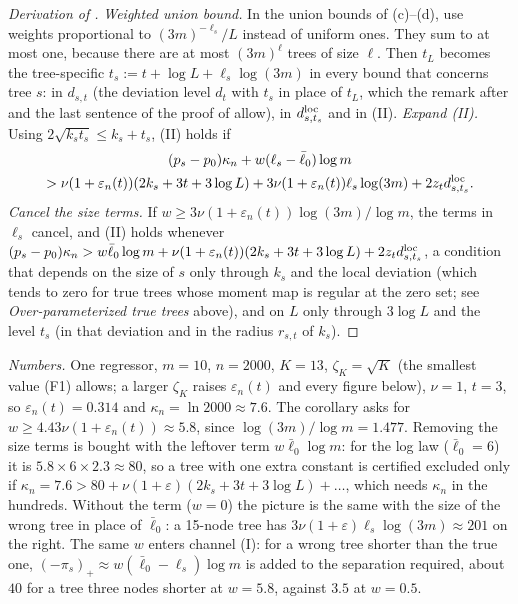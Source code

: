 \begin{proof}[Derivation of ]
\emph{Weighted union bound.} In the union bounds of (c)--(d), use weights proportional to $(3m)^{-\ell_s}/L$ instead of uniform ones. They sum to at most one, because there are at most $(3m)^{\ell}$ trees of size $\ell$. Then $t_L$ becomes the tree-specific $t_s := t + \log L + \ell_s\log(3m)$ in every bound that concerns tree $s$: in $d_{s,t}$ (the deviation level $d_t$ with $t_s$ in place of $t_L$, which the remark after  and the last sentence of the proof of  allow), in $d^{\mathrm{loc}}_{s,t_s}$ and in (II). \emph{Expand (II).} Using $2\sqrt{k_st_s} \le k_s + t_s$, (II) holds if
\begin{multline*}
(p_s - p_0)\kappa_n + w(\ell_s - \bar\ell_0)\log m \\ > \nu(1 + \varepsilon_n(t))(2k_s + 3t + 3\log L) + 3\nu(1 + \varepsilon_n(t))\ell_s\log(3m) + 2z_td^{\mathrm{loc}}_{s,t_s}.
\end{multline*}
\emph{Cancel the size terms.} If $w \ge 3\nu(1 + \varepsilon_n(t))\log(3m)/\log m$, the terms in $\ell_s$ cancel, and (II) holds whenever $(p_s - p_0)\kappa_n > w\bar\ell_0\log m + \nu(1 + \varepsilon_n(t))(2k_s + 3t + 3\log L) + 2z_td^{\mathrm{loc}}_{s,t_s}$, a condition that depends on the size of $s$ only through $k_s$ and the local deviation (which tends to zero for true trees whose moment map is regular at the zero set; see \emph{Over-parameterized true trees} above), and on $L$ only through $3\log L$ and the level $t_s$ (in that deviation and in the radius $r_{s,t}$ of $k_s$).
\end{proof}

\medskip\noindent\emph{Numbers.} One regressor, $m = 10$, $n = 2000$, $K = 13$, $\zeta_K = \sqrt K$ (the smallest value (F1) allows; a larger $\zeta_K$ raises $\varepsilon_n(t)$ and every figure below), $\nu = 1$, $t = 3$, so $\varepsilon_n(t) = 0.314$ and $\kappa_n = \ln 2000 \approx 7.6$. The corollary asks for $w \ge 4.43\nu(1 + \varepsilon_n(t)) \approx 5.8$, since $\log(3m)/\log m = 1.477$. Removing the size terms is bought with the leftover term $w\bar\ell_0\log m$: for the log law ($\bar\ell_0 = 6$) it is $5.8 \times 6 \times 2.3 \approx 80$, so a tree with one extra constant is certified excluded only if $\kappa_n = 7.6 > 80 + \nu(1 + \varepsilon)(2k_s + 3t + 3\log L) + \dots$, which needs $\kappa_n$ in the hundreds. Without the term ($w = 0$) the picture is the same with the size of the wrong tree in place of $\bar\ell_0$: a 15-node tree has $3\nu(1 + \varepsilon)\ell_s\log(3m) \approx 201$ on the right. The same $w$ enters channel (I): for a wrong tree shorter than the true one, $(-\pi_s)_+ \approx w(\bar\ell_0 - \ell_s)\log m$ is added to the separation required, about $40$ for a tree three nodes shorter at $w = 5.8$, against $3.5$ at $w = 0.5$.

